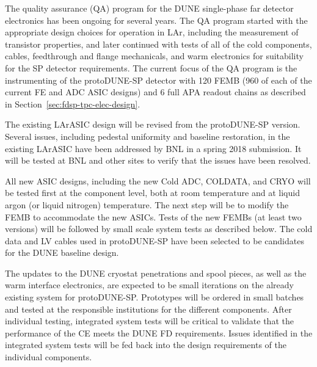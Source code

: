 The quality assurance (QA) program for the DUNE single-phase far detector electronics has been ongoing for several years.  The QA program started with the appropriate design choices for operation
in LAr, including the measurement of transistor properties, and later
continued with tests of all of the cold components, cables, feedthrough and flange mechanicals, and warm electronics for suitability for the SP detector requirements.  The current focus of the QA program is the instrumenting of the protoDUNE-SP detector with 120 FEMB (960 of each of the current FE and ADC ASIC designs) and 6 full APA readout chains as described in Section~\ref{sec:fdsp-tpc-elec-design}.

The existing LArASIC design will be revised from the protoDUNE-SP version. Several issues, 
including pedestal uniformity and baseline restoration, in the existing LArASIC have been 
addressed by BNL in a spring 2018 submission. It will be tested at BNL and other sites to 
verify that the issues have been resolved. 

All new ASIC designs, including the new Cold ADC, COLDATA, and CRYO will be tested first at the component level, both at room temperature and at liquid argon (or liquid nitrogen) temperature. The next step will be to modify the FEMB to accommodate the new ASICs.  Tests of the new FEMBs (at least two versions) will be followed by small scale system tests as described below.  The cold data and LV cables used in protoDUNE-SP have been selected to be candidates for the DUNE baseline design.%

The updates to the DUNE cryostat penetrations and spool pieces, as well as the warm interface electronics, are expected to be small iterations on the already existing system for protoDUNE-SP.  Prototypes will be ordered in small batches and tested at the responsible institutions for the different components.  After individual testing, integrated system tests will be critical to validate that the performance of the CE meets the DUNE FD requirements.  Issues identified in the integrated system tests will be fed back into the design requirements of the individual components.
